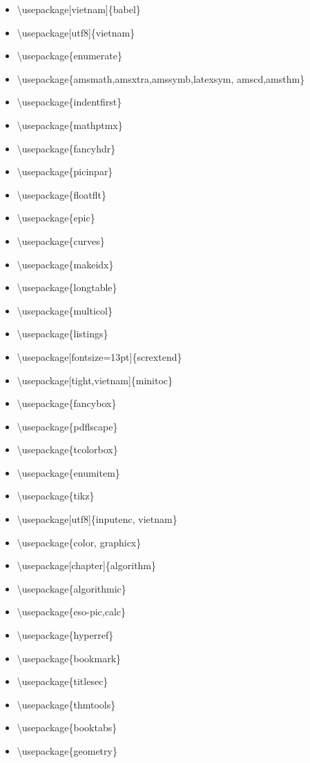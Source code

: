 \begin{itemize}
	\item \textbackslash usepackage[vietnam]\{babel\}
	\item \textbackslash usepackage[utf8]\{vietnam\}
	\item \textbackslash usepackage\{enumerate\}
	\item \textbackslash usepackage\{amsmath,amsxtra,amssymb,latexsym, amscd,amsthm\}
	\item \textbackslash usepackage\{indentfirst\}
	\item \textbackslash usepackage\{mathptmx\}
	\item \textbackslash usepackage\{fancyhdr\}
	\item \textbackslash usepackage\{picinpar\}
	\item \textbackslash usepackage\{floatflt\}
	\item \textbackslash usepackage\{epic\}
	\item \textbackslash usepackage\{curves\}
	\item \textbackslash usepackage\{makeidx\}
	\item \textbackslash usepackage\{longtable\}
	\item \textbackslash usepackage\{multicol\}
	\item \textbackslash usepackage\{listings\}
	\item \textbackslash usepackage[fontsize=13pt]\{scrextend\}
	\item \textbackslash usepackage[tight,vietnam]\{minitoc\}
	\item \textbackslash usepackage\{fancybox\}
	\item \textbackslash usepackage\{pdflscape\}
	\item \textbackslash usepackage\{tcolorbox\}
	\item \textbackslash usepackage\{enumitem\}  
	\item \textbackslash usepackage\{tikz\}
	\item \textbackslash usepackage[utf8]\{inputenc, vietnam\}
	\item \textbackslash usepackage\{color, graphicx\}
	\item \textbackslash usepackage[chapter]\{algorithm\}
	\item \textbackslash usepackage\{algorithmic\}
	\item \textbackslash usepackage\{eso-pic,calc\}
	\item \textbackslash usepackage\{hyperref\}
	\item \textbackslash usepackage\{bookmark\}
	\item \textbackslash usepackage\{titlesec\}
	\item \textbackslash usepackage\{thmtools\}
	\item \textbackslash usepackage\{booktabs\}
	\item \textbackslash usepackage\{geometry\}
	
\end{itemize}

